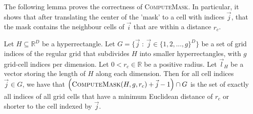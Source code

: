 The following lemma proves the correctness of \textsc{ComputeMask}. In particular, it shows that after translating the center of the 'mask' to a cell with indices $\vec{j}$, that the mask contains the neighbour cells of $\vec{i}$ that are within a distance $r_c$.
\begin{lemma}
	Let $H \subseteq \mathbb{R}^D$ be a hyperrectangle. 
	Let $G = \{\vec{j} \; : \: \vec{j} \in \{1, 2, \dots, g\}^D\}$ be a set of grid indices of the regular grid that subdivides $H$ into smaller hyperrectangles, with $g$ grid-cell indices per dimension. 
	Let $0 < r_c \in \mathbb{R}$ be a positive radius. 
	Let $\vec{l}_{H}$ be a vector storing the length of $H$ along each dimension.
	Then for all cell indices $\vec{j} \in G$, we have that $\left( \textsc{ComputeMask}(H, g, r_c) + \vec{j} - 1 \right) \cap G$ is the set of exactly all indices of all grid cells that have a minimum Euclidean distance of $r_c$ or shorter to the cell indexed by $\vec{j}$.
	\label{lemma:compute_mask}
\end{lemma}
